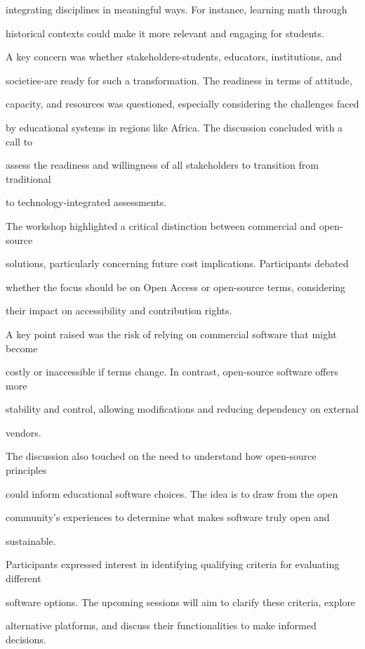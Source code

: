 \documentclass[11pt]{article}
\begin{document}
integrating disciplines in meaningful ways. For instance, learning math through

historical contexts could make it more relevant and engaging for students.

A key concern was whether stakeholders-students, educators, institutions, and

societies-are ready for such a transformation. The readiness in terms of attitude,

capacity, and resources was questioned, especially considering the challenges faced

by educational systems in regions like Africa. The discussion concluded with a call to

assess the readiness and willingness of all stakeholders to transition from traditional

to technology-integrated assessments.

The workshop highlighted a critical distinction between commercial and open-source

solutions, particularly concerning future cost implications. Participants debated

whether the focus should be on Open Access or open-source terms, considering

their impact on accessibility and contribution rights.

A key point raised was the risk of relying on commercial software that might become

costly or inaccessible if terms change. In contrast, open-source software offers more

stability and control, allowing modifications and reducing dependency on external

vendors.

The discussion also touched on the need to understand how open-source principles

could inform educational software choices. The idea is to draw from the open

community's experiences to determine what makes software truly open and

sustainable.

Participants expressed interest in identifying qualifying criteria for evaluating different

software options. The upcoming sessions will aim to clarify these criteria, explore

alternative platforms, and discuss their functionalities to make informed decisions.
\end{document}

